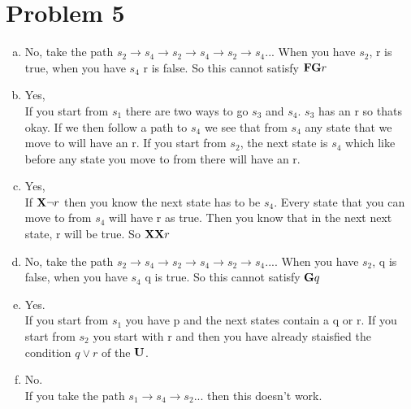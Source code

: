 \documentclass[11pt,leqno,fleqn]{article}
\begin{document}
\newpage
\section{Problem 5}
 \begin{enumerate}[(a)]
 
 \item 
 No, take the path $s_2 \to s_4 \to s_2 \to s_4 \to s_2 \to s_4$... When you have $s_2$, r is true, when you have $s_4$ r is false. So this cannot satisfy $\bold{FG}r$

\item
Yes,\\
If you start from $s_1$ there are two ways to go $s_3$ and $s_4$. $s_3$ has an r so thats okay. If we then follow a path to $s_4$ we see that from $s_4$ any state that we move to will have an r. If you start from $s_2$, the next state is $s_4$ which like before any state you move to from there will have an r.

\item
Yes,\\
If $\bold{X}\neg r$ then you know the next state has to be $s_4$. Every state that you can move to from $s_4$ will have r as true. Then you know that in the next next state, r will be true. So $\bold{XX}r$

\item
No, take the path $s_2 \to s_4 \to s_2 \to s_4 \to s_2 \to s_4$.... When you have $s_2$, q is false, when you have $s_4$ q is true. So this cannot satisfy $\bold{G}q$

\item
Yes.\\
If you start from $s_1$ you have p and the next states contain a q or  r. If you start from $s_2$ you start with r and then you have already staisfied the condition $q \lor r$ of the $\bold{U}$.

\item
 No.\\
 If you take the path $s_1 \to s_4 \to s_2...$ then this doesn't work.
 
  \end{enumerate}
\end{document}
